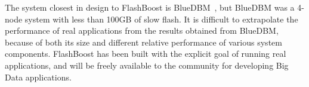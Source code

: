 The system closest in design to FlashBoost is BlueDBM~\cite{bluedbm}, but BlueDBM was a 4-node system with less than 100GB of slow flash. It is difficult to extrapolate the performance of real applications from the results obtained from BlueDBM, because of both its size and different relative performance of various system components. FlashBoost has been built with the explicit goal of running real applications, and will be freely available to the community for developing Big Data applications.

